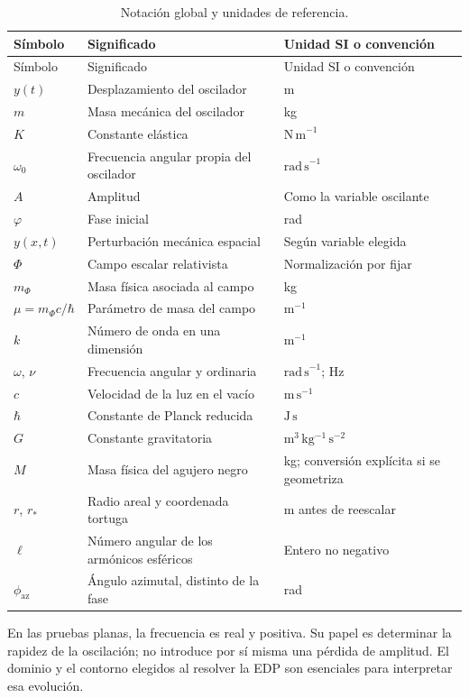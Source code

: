\small
\begin{longtable}{@{}p{}p{}p{}@{}}
\caption{Notación global y unidades de referencia.}\label{tab:notacion-global}\\
\toprule
Símbolo & Significado & Unidad SI o convención \\
\midrule
\endfirsthead
\toprule
Símbolo & Significado & Unidad SI o convención \\
\midrule
\endhead
\bottomrule
\endfoot
$y(t)$ & Desplazamiento del oscilador & m \\
$m$ & Masa mecánica del oscilador & kg \\
$K$ & Constante elástica & $\mathrm{N\,m}^{-1}$ \\
$\omega_0$ & Frecuencia angular propia del oscilador & $\mathrm{rad\,s}^{-1}$ \\
$A$ & Amplitud & Como la variable oscilante \\
$\varphi$ & Fase inicial & rad \\
$y(x,t)$ & Perturbación mecánica espacial & Según variable elegida \\
$\Phi$ & Campo escalar relativista & Normalización por fijar \\
$m_\Phi$ & Masa física asociada al campo & kg \\
$\mu=m_\Phi c/\hbar$ & Parámetro de masa del campo & $\mathrm{m}^{-1}$ \\
$k$ & Número de onda en una dimensión & $\mathrm{m}^{-1}$ \\
$\omega$, $\nu$ & Frecuencia angular y ordinaria & $\mathrm{rad\,s}^{-1}$; Hz \\
$c$ & Velocidad de la luz en el vacío & $\mathrm{m\,s}^{-1}$ \\
$\hbar$ & Constante de Planck reducida & $\mathrm{J\,s}$ \\
$G$ & Constante gravitatoria & $\mathrm{m^3\,kg^{-1}\,s^{-2}}$ \\
$M$ & Masa física del agujero negro & kg; conversión explícita si se geometriza \\
$r$, $r_*$ & Radio areal y coordenada tortuga & m antes de reescalar \\
$\ell$ & Número angular de los armónicos esféricos & Entero no negativo \\
$\phi_{\mathrm{az}}$ & Ángulo azimutal, distinto de la fase & rad \\
\end{longtable}
\normalsize


En las pruebas planas, la frecuencia es real y positiva. Su papel es
determinar la rapidez de la oscilación; no introduce por sí misma una
pérdida de amplitud. El dominio y el contorno elegidos al resolver la
EDP son esenciales para interpretar esa evolución.
